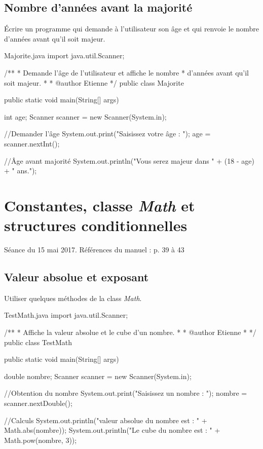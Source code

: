 \documentclass[12pt]{article}
\begin{document}
\subsection{Nombre d'années avant la majorité}

Écrire un programme qui demande à l'utilisateur son âge et qui renvoie le nombre d'années avant qu'il soit majeur.

\begin{MyTCB}{Majorite.java}
import java.util.Scanner;

/**
 * Demande l'âge de l'utilisateur et affiche le nombre
 * d'années avant qu'il soit majeur.
 * 
 * @author Etienne
 */
public class Majorite {

	public static void main(String[] args) {
		
		int age;
		Scanner scanner = new Scanner(System.in);
		
		//Demander l'âge
		System.out.print("Saisissez votre âge : ");
		age = scanner.nextInt();
		
		//Âge avant majorité
		System.out.println("Vous serez majeur dans " + (18 - age) + " ans.");

	}

}
\end{MyTCB}
%
%
%
%
%
\section{Constantes, classe \emph{Math} et structures conditionnelles}
\vspace*{-\baselineskip}
Séance du 15 mai 2017. Références du manuel : p. 39 à 43


\subsection{Valeur absolue et exposant}

Utiliser quelques méthodes de la class \emph{Math}.

\begin{MyTCB}{TestMath.java}
import java.util.Scanner;

/**
 * Affiche la valeur absolue et le cube d'un nombre.
 * 
 * @author Etienne
 *
 */
public class TestMath {

	public static void main(String[] args) {
		
		double nombre;
		Scanner scanner = new Scanner(System.in);
		
		//Obtention du nombre
		System.out.print("Saisissez un nombre : ");
		nombre = scanner.nextDouble();
		
		//Calculs
		System.out.println("\nLa valeur absolue du nombre est : " + Math.abs(nombre));
		System.out.println("Le cube du nombre est : " + Math.pow(nombre, 3));

	}

}
\end{MyTCB}
%
%
%
\end{document}
